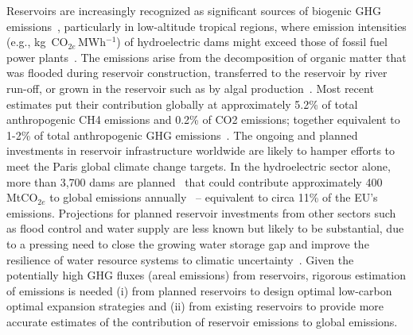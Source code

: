 \documentclass[final,1p,times]{elsarticle}
\begin{document}
Reservoirs are increasingly recognized as significant sources of biogenic \ac{GHG} emissions~\citep{Barros2011}, particularly in low-altitude tropical regions, where emission intensities (e.g., kg~CO$_{2e}$\,MWh$^{-1}$) of hydroelectric dams might exceed those of fossil fuel power plants~\citep{Fearnside2002}.
The emissions arise from the decomposition of organic matter that was flooded during reservoir construction, transferred to the reservoir by river run-off, or grown in the reservoir such as by algal production~\citep{Louis2000}.
Most recent estimates put their contribution globally at approximately 5.2\% of total anthropogenic \ac{CH4} emissions and 0.2\% of \ac{CO2} emissions; together equivalent to 1-2\% of total anthropogenic \ac{GHG} emissions~\cite{Soued2022}.
The ongoing and planned investments in reservoir infrastructure worldwide are likely to hamper efforts to meet the Paris global climate change targets.
In the hydroelectric sector alone, more than 3,700 dams are planned~\cite{Zarfl2015,Bouckaert2021} that could contribute approximately 400\,MtCO$_{2e}$ to global emissions annually~\cite{janus2025planning} -- equivalent to circa 11\% of the EU’s emissions. 
Projections for planned reservoir investments from other sectors such as flood control and water supply are less known but likely to be substantial, due to a pressing need to close the growing water storage gap \cite{Yu2021} and improve the resilience of water resource systems to climatic uncertainty~\cite{ipcc2018, Sarkodie2022}.
Given the potentially high \ac{GHG} fluxes (areal emissions) from reservoirs, rigorous estimation of emissions is needed (i) from planned reservoirs to design optimal low-carbon optimal expansion strategies and (ii) from existing reservoirs to provide more accurate estimates of the contribution of reservoir emissions to global emissions.

\end{document}
